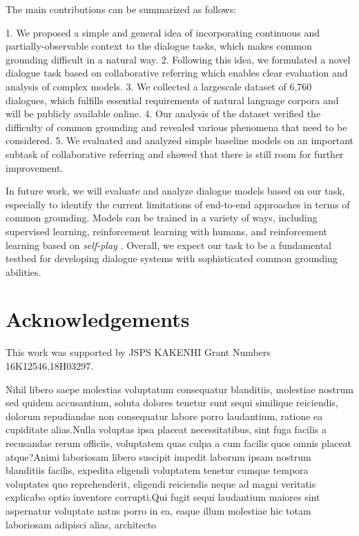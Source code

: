 \documentclass[letterpaper]{article} %
\begin{document}
The main contributions can be summarized as follows:

\begin{itemize}
1. We proposed a simple and general idea of incorporating continuous and partially-observable context to the dialogue tasks, which makes common grounding difficult in a natural way.
2. Following this idea, we formulated a novel dialogue task based on collaborative referring which enables clear evaluation and analysis of complex models.
3. We collected a largescale dataset of 6,760 dialogues, which fulfills essential requirements of natural language corpora and will be publicly available online.
4. Our analysis of the dataset verified the difficulty of common grounding and revealed various phenomena that need to be considered.
5. We evaluated and analyzed simple baseline models on an important subtask of collaborative referring and showed that there is still room for further improvement.
\end{itemize}

In future work, we will evaluate and analyze dialogue models based on our task, especially to identify the current limitations of end-to-end approaches in terms of common grounding. Models can be trained in a variety of ways, including supervised learning, reinforcement learning with humans, and reinforcement learning based on \emph{self-play} \cite{lewis2017deal}. Overall, we expect our task to be a fundamental testbed for developing dialogue systems with sophisticated common grounding abilities.

\vspace{-0.84mm}
\section*{Acknowledgements}
This work was supported by JSPS KAKENHI Grant Numbers 16K12546,18H03297.

\fontsize{9.5pt}{10.5pt} \selectfont  Nihil libero saepe molestias voluptatum consequatur blanditiis, molestiae nostrum sed quidem accusantium, soluta dolores tenetur sunt sequi similique reiciendis, dolorum repudiandae non consequatur labore porro laudantium, ratione ea cupiditate alias.Nulla voluptas ipsa placeat necessitatibus, sint fuga facilis a recusandae rerum officiis, voluptatem quas culpa a cum facilis quos omnis placeat atque?Animi laboriosam libero suscipit impedit laborum ipsam nostrum blanditiis facilis, expedita eligendi voluptatem tenetur cumque tempora voluptates quo reprehenderit, eligendi reiciendis neque ad magni veritatis explicabo optio inventore corrupti.Qui fugit sequi laudantium maiores sint aspernatur voluptate natus porro in ea, eaque illum molestiae hic totam laboriosam adipisci alias, architecto


\end{document}
